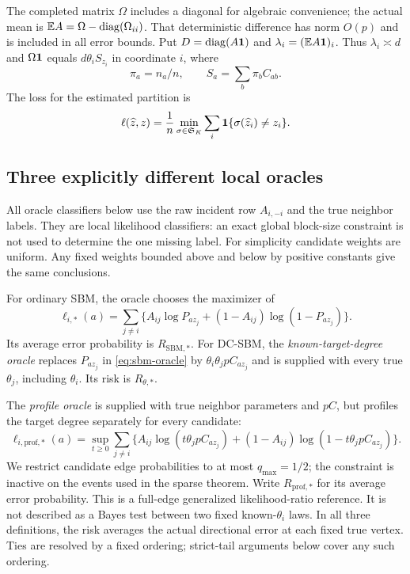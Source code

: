 The completed matrix $\Omega$ includes a diagonal for algebraic convenience;
the actual mean is $\mathbb E A=\Omega-\operatorname{diag}(\Omega_{ii})$.
That deterministic difference has norm $O(p)$ and is included in all error
bounds. Put $D=\operatorname{diag}(A\mathbf 1)$ and
$\lambda_i=(\mathbb E A\mathbf 1)_i$. Thus $\lambda_i\asymp d$ and
$\Omega\mathbf 1$ equals $d\theta_i S_{z_i}$ in coordinate $i$, where
\begin{equation}\label{eq:exposures}
 \pi_a=n_a/n,\qquad S_a=\sum_b\pi_b C_{ab}.
\end{equation}
The loss for the estimated partition is
\[
 \ell(\widehat z,z)=\frac1n\min_{\sigma\in\mathfrak S_K}
 \sum_i\mathbf1\{\sigma(\widehat z_i)\ne z_i\}.
\]

\subsection{Three explicitly different local oracles}\label{sec:oracle}

All oracle classifiers below use the raw incident row $A_{i,-i}$ and the
true neighbor labels. They are local likelihood classifiers: an exact global
block-size constraint is not used to determine the one missing label.
For simplicity candidate weights are uniform. Any fixed weights bounded
above and below by positive constants give the same conclusions.

For ordinary SBM, the oracle chooses the maximizer of
\begin{equation}\label{eq:sbm-oracle}
 \ell_{i,*}(a)=\sum_{j\ne i}
 \{A_{ij}\log P_{a z_j}+(1-A_{ij})\log(1-P_{a z_j})\}.
\end{equation}
Its average error probability is $R_{\mathrm{SBM},*}$.
For DC-SBM, the \emph{known-target-degree oracle} replaces $P_{a z_j}$ in
\eqref{eq:sbm-oracle} by $\theta_i\theta_j p C_{a z_j}$ and is supplied
with every true $\theta_j$, including $\theta_i$. Its risk is
$R_{\theta,*}$.

The \emph{profile oracle} is supplied with true neighbor parameters and
$pC$, but profiles the target degree separately for every candidate:
\begin{equation}\label{eq:profile-oracle}
 \ell_{i,\mathrm{prof},*}(a)=
 \sup_{t\ge0}\sum_{j\ne i}
 \{A_{ij}\log(t\theta_jpC_{a z_j})
 +(1-A_{ij})\log(1-t\theta_jpC_{a z_j})\}.
\end{equation}
We restrict candidate edge probabilities to at most $q_{\max}=1/2$; the
constraint is inactive on the events used in the sparse theorem. Write
$R_{\mathrm{prof},*}$ for its average error probability. This is a
full-edge generalized likelihood-ratio reference. It is not described as a
Bayes test between two fixed known-$\theta_i$ laws. In all three definitions,
the risk averages the actual directional error at each fixed true vertex.
Ties are resolved by a fixed ordering; strict-tail arguments below cover
any such ordering.

